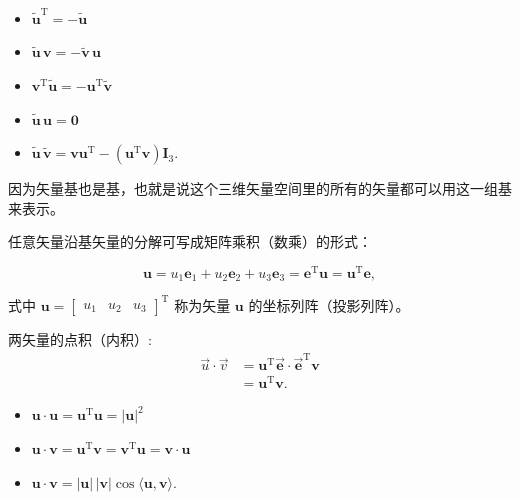 \begin{property}[叉乘矩阵的性质]
	\begin{itemize}
		\item $\tilde{\boldsymbol{u}}^{\mathrm{T}} = -\tilde{\boldsymbol{u}}$
		\item $\tilde{\boldsymbol{u}}\,\boldsymbol{v} = -\tilde{\boldsymbol{v}}\,\boldsymbol{u}$
		\item $\boldsymbol{v}^{\mathrm{T}}\tilde{\boldsymbol{u}} = -\boldsymbol{u}^{\mathrm{T}}\tilde{\boldsymbol{v}}$
		\item $\tilde{\boldsymbol{u}}\,\boldsymbol{u} = \boldsymbol{0}$
		\item $\tilde{\boldsymbol{u}}\,\tilde{\boldsymbol{v}} = \boldsymbol{v}\boldsymbol{u}^{\mathrm{T}} - \left(\boldsymbol{u}^{\mathrm{T}}\boldsymbol{v}\right)\boldsymbol{I}_3.$
	\end{itemize}
\end{property}

因为矢量基也是基，也就是说这个三维矢量空间里的所有的矢量都可以用这一组基来表示。

任意矢量沿基矢量的分解可写成矩阵乘积（数乘）的形式：

$$
\boldsymbol{u} = u_1\mathbf{e}_1 + u_2\mathbf{e}_2 + u_3\mathbf{e}_3
= \boldsymbol{e}^{\mathrm{T}}\boldsymbol{u} = \boldsymbol{u}^{\mathrm{T}}\boldsymbol{e},
$$

式中 $\boldsymbol{u} = \begin{bmatrix} u_1 & u_2 & u_3 \end{bmatrix}^{\mathrm{T}}$ 称为矢量 $\boldsymbol{u}$ 的坐标列阵（投影列阵）。

\begin{definition}[向量的点积]
	两矢量的点积（内积）:
	$$
	\begin{aligned}
		\vec{u} \cdot \vec{v} & =\boldsymbol{u}^{\mathrm{T}} \overrightarrow{\boldsymbol{e}} \cdot \overrightarrow{\boldsymbol{e}}^{\mathrm{T}} \boldsymbol{v} \\
		& =\boldsymbol{u}^{\mathrm{T}} \boldsymbol{v} .
	\end{aligned}
	$$
\end{definition}

\begin{property}[向量点积的性质]
	\begin{itemize}
		\item $\boldsymbol{u}\cdot\boldsymbol{u} = \boldsymbol{u}^{\mathrm{T}}\boldsymbol{u} = |\boldsymbol{u}|^2$
		\item $\boldsymbol{u}\cdot\boldsymbol{v} = \boldsymbol{u}^{\mathrm{T}}\boldsymbol{v} = \boldsymbol{v}^{\mathrm{T}}\boldsymbol{u} = \boldsymbol{v}\cdot\boldsymbol{u}$
		\item $\boldsymbol{u}\cdot\boldsymbol{v} = |\boldsymbol{u}|\,|\boldsymbol{v}|\cos\langle\boldsymbol{u},\boldsymbol{v}\rangle.$
	\end{itemize}
\end{property}

